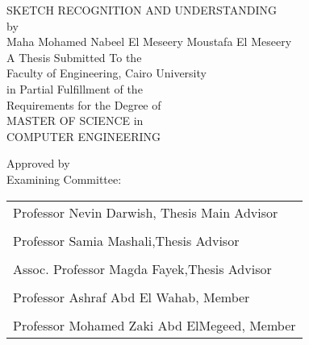 \documentclass[11pt,doublespace]{SketchThesis}
\begin{document}
                                                      
\begin{center}     
SKETCH RECOGNITION AND UNDERSTANDING\\
\normalsize by      \\ 
Maha Mohamed Nabeel El Meseery Moustafa El Meseery\\
\vspace*{0.2cm}        
A Thesis Submitted To the\\
Faculty of Engineering, Cairo University\\
in Partial Fulfillment of the\\
Requirements for the Degree of\\
MASTER OF SCIENCE
in\\
COMPUTER ENGINEERING\\
\end{center}         
Approved by\\                                           
Examining Committee:\\ \vspace*{0.2cm} 
\begin{tabular*}{0.9\textwidth}{l   }
\\ \hline 
Professor Nevin Darwish, Thesis Main Advisor\\ \\  \hline  
Professor Samia Mashali,Thesis Advisor \\  \\ \hline   
Assoc. Professor Magda Fayek,Thesis Advisor\\  \\  \hline  
Professor  Ashraf Abd El Wahab, Member\\ \\ \hline  
Professor Mohamed Zaki Abd ElMegeed, Member\\  

		\end{tabular*}
\end{document}
